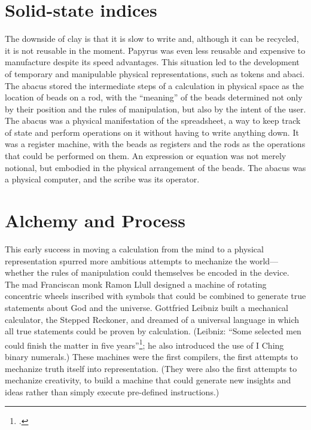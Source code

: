\section{Solid-state indices}

The downside of clay is that it is slow to write and, although it can be recycled, it is not reusable in the moment.  Papyrus was even less reusable and expensive to manufacture despite its speed advantages.  This situation led to the development of temporary and manipulable physical representations, such as tokens and abaci.  The abacus stored the intermediate steps of a calculation in physical space as the location of beads on a rod, with the ``meaning'' of the beads determined not only by their position and the rules of manipulation, but also by the intent of the user.  The abacus was a physical manifestation of the spreadsheet, a way to keep track of state and perform operations on it without having to write anything down.  It was a register machine, with the beads as registers and the rods as the operations that could be performed on them.  An expression or equation was not merely notional, but embodied in the physical arrangement of the beads.  The abacus was a physical computer, and the scribe was its operator.

\section{Alchemy and Process}

This early success in moving a calculation from the mind to a physical representation spurred more ambitious attempts to mechanize the world---whether the rules of manipulation could themselves be encoded in the device.  The mad Franciscan monk Ramon Llull designed a machine of rotating concentric wheels inscribed with symbols that could be combined to generate true statements about God and the universe.  Gottfried Leibniz built a mechanical calculator, the Stepped Reckoner, and dreamed of a universal language in which all true statements could be proven by calculation.  (Leibniz:  ``Some selected men could finish the matter in five years''\footnote{\citet[p.~224]{Loemker1969}.}; he also introduced the use of I Ching binary numerals.)  These machines were the first compilers, the first attempts to mechanize truth itself into representation.  (They were also the first attempts to mechanize creativity, to build a machine that could generate new insights and ideas rather than simply execute pre-defined instructions.)

